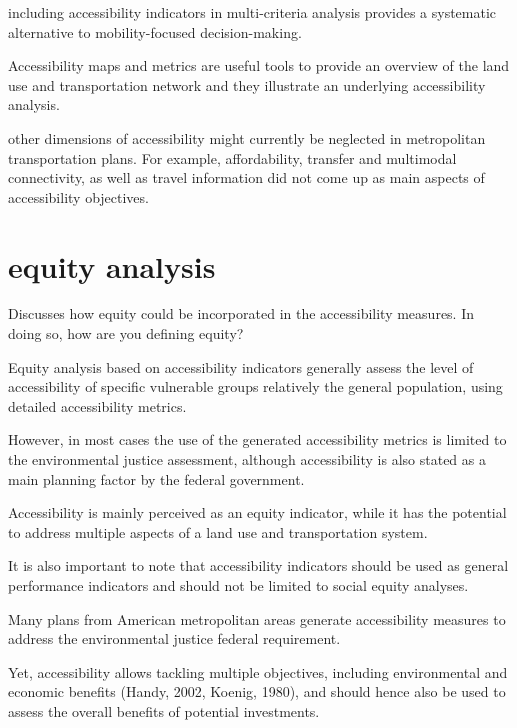 \documentclass[12pt,]{article}
\begin{document}
including accessibility indicators in multi-criteria analysis provides a
systematic alternative to mobility-focused decision-making.

Accessibility maps and metrics are useful tools to provide an overview
of the land use and transportation network and they illustrate an
underlying accessibility analysis.

other dimensions of accessibility might currently be neglected in
metropolitan transportation plans. For example, affordability, transfer
and multimodal connectivity, as well as travel information did not come
up as main aspects of accessibility objectives.

\hypertarget{equity-analysis}{%
\section{equity analysis}\label{equity-analysis}}

Discusses how equity could be incorporated in the accessibility
measures. In doing so, how are you defining equity?

Equity analysis based on accessibility indicators generally assess the
level of accessibility of specific vulnerable groups relatively the
general population, using detailed accessibility metrics.

However, in most cases the use of the generated accessibility metrics is
limited to the environmental justice assessment, although accessibility
is also stated as a main planning factor by the federal government.

Accessibility is mainly perceived as an equity indicator, while it has
the potential to address multiple aspects of a land use and
transportation system.

It is also important to note that accessibility indicators should be
used as general performance indicators and should not be limited to
social equity analyses.

Many plans from American metropolitan areas generate accessibility
measures to address the environmental justice federal requirement.

Yet, accessibility allows tackling multiple objectives, including
environmental and economic benefits (Handy, 2002, Koenig, 1980), and
should hence also be used to assess the overall benefits of potential
investments.
\end{document}
